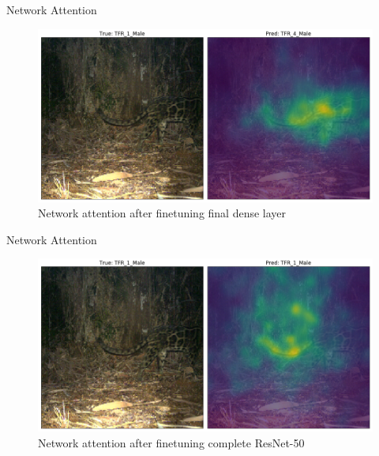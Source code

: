 \documentclass[10pt]{beamer}
\begin{document}
\begin{frame}{Network Attention}
	\centering
	\begin{figure}
		\includegraphics[width=\columnwidth]{images/finetune_Attention.png}
		\caption{Network attention after finetuning final dense layer}
	\end{figure}
\end{frame}


\begin{frame}{Network Attention}
	\centering
	\begin{figure}
		\includegraphics[width=\columnwidth]{images/finetune_Attention_later.png}
		\caption{Network attention after finetuning complete ResNet-50}
	\end{figure}
\end{frame}


{\1
\begin{frame}
\end{frame}}
\end{document}
